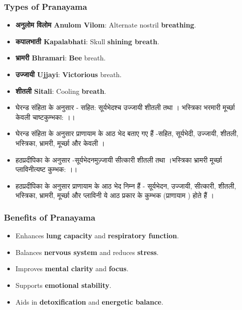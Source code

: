 \begin{frame}[fragile]\frametitle{Types of Pranayama}

      \begin{itemize}
        \item \textbf{अनुलोम विलोम  Anulom Vilom}: Alternate nostril \textbf{breathing}.
        \item \textbf{कपालभाती  Kapalabhati}: Skull \textbf{shining breath}.
        \item \textbf{भ्रामरी Bhramari}: \textbf{Bee} breath.
        \item \textbf{उज्जायी Ujjayi}: \textbf{Victorious} breath.
        \item \textbf{शीतली Sitali}: Cooling \textbf{breath}.
        \item घेरन्ड संहिता के अनुसार - सहित: सूर्यभेदश्च उज्जायी शीतली तथा । भस्त्रिका भरमारी मूर्च्छा केवली चाष्टकुम्भका: ।।
        \item घेरन्ड संहिता के अनुसार प्राणायाम के आठ भेद बताए गए हैं -सहित, सूर्यभेदी, उज्जायी, शीतली, भस्त्रिका, भ्रामरी, मूर्च्छा और केवली ।
        \item हठप्रदीपिका के अनुसार -सूर्यभेदनमुज़्जायी सीत्कारी शीतली तथा ।भस्त्रिका भ्रामरी मूर्च्छा प्लाविनीत्यष्ट कुम्भक: ।।
        \item हठप्रदीपिका के अनुसार प्राणायाम के आठ भेद निम्न हैं - सूर्यभेदन, उज्जायी, सीत्कारी, शीतली, भस्त्रिका, भ्रामरी, मूर्च्छा और प्लाविनी ये आठ प्रकार के कुम्भक (प्राणायाम ) होते हैं ।
		
      \end{itemize}

\end{frame}

\begin{frame}[fragile]\frametitle{Benefits of Pranayama}
      \begin{itemize}
        \item Enhances \textbf{lung capacity} and \textbf{respiratory function}.
        \item Balances \textbf{nervous system} and reduces \textbf{stress}.
        \item Improves \textbf{mental clarity} and \textbf{focus}.
        \item Supports \textbf{emotional stability}.
        \item Aids in \textbf{detoxification} and \textbf{energetic balance}.
      \end{itemize}

\end{frame}

